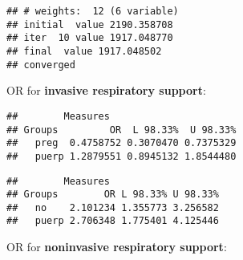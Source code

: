 \documentclass[
]{article}
\newenvironment{Shaded}{\begin{snugshade}}{\end{snugshade}}
\newcommand{\CommentTok}[1]{\textcolor[rgb]{0.56,0.35,0.01}{\textit{#1}}}
\newcommand{\KeywordTok}[1]{\textcolor[rgb]{0.13,0.29,0.53}{\textbf{#1}}}
\newcommand{\NormalTok}[1]{#1}
\newcommand{\OperatorTok}[1]{\textcolor[rgb]{0.81,0.36,0.00}{\textbf{#1}}}
\newcommand{\StringTok}[1]{\textcolor[rgb]{0.31,0.60,0.02}{#1}}
\begin{document}
\begin{verbatim}
## # weights:  12 (6 variable)
## initial  value 2190.358708 
## iter  10 value 1917.048770
## final  value 1917.048502 
## converged
\end{verbatim}

\begin{Shaded}
\end{Shaded}

OR for \textbf{invasive respiratory support}:

\begin{Shaded}
\end{Shaded}

\begin{verbatim}
##        Measures
## Groups         OR  L 98.33%  U 98.33%
##   preg  0.4758752 0.3070470 0.7375329
##   puerp 1.2879551 0.8945132 1.8544480
\end{verbatim}

\begin{Shaded}
\end{Shaded}

\begin{verbatim}
##        Measures
## Groups        OR L 98.33% U 98.33%
##   no    2.101234 1.355773 3.256582
##   puerp 2.706348 1.775401 4.125446
\end{verbatim}

OR for \textbf{noninvasive respiratory support}:

\begin{Shaded}
\end{Shaded}
\end{document}
